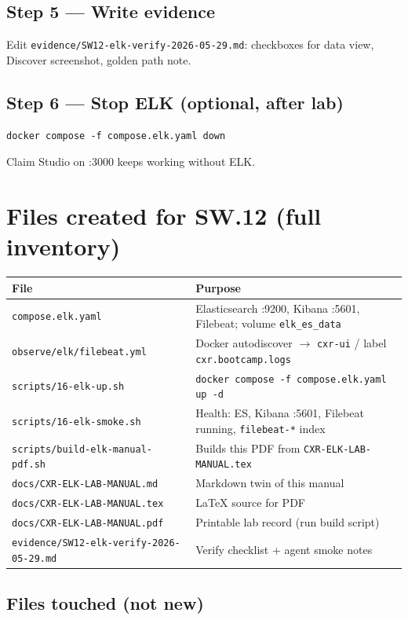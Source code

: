 \documentclass[11pt,a4paper]{report}
\begin{document}
\section{Step 5 --- Write evidence}
Edit \texttt{evidence/SW12-elk-verify-2026-05-29.md}: checkboxes for data view, Discover screenshot, golden path note.

\section{Step 6 --- Stop ELK (optional, after lab)}
\begin{lstlisting}[style=bash]
docker compose -f compose.elk.yaml down
\end{lstlisting}
Claim Studio on :3000 keeps working without ELK.

\chapter{Files created for SW.12 (full inventory)}

\begin{longtable}{@{}p{4.8cm}p{8.2cm}@{}}
\toprule
File & Purpose \\
\midrule
\endhead
\texttt{compose.elk.yaml} & Elasticsearch :9200, Kibana :5601, Filebeat; volume \texttt{elk\_es\_data} \\
\texttt{observe/elk/filebeat.yml} & Docker autodiscover $\rightarrow$ \texttt{cxr-ui} / label \texttt{cxr.bootcamp.logs} \\
\texttt{scripts/16-elk-up.sh} & \texttt{docker compose -f compose.elk.yaml up -d} \\
\texttt{scripts/16-elk-smoke.sh} & Health: ES, Kibana :5601, Filebeat running, \texttt{filebeat-*} index \\
\texttt{scripts/build-elk-manual-pdf.sh} & Builds this PDF from \texttt{CXR-ELK-LAB-MANUAL.tex} \\
\texttt{docs/CXR-ELK-LAB-MANUAL.md} & Markdown twin of this manual \\
\texttt{docs/CXR-ELK-LAB-MANUAL.tex} & LaTeX source for PDF \\
\texttt{docs/CXR-ELK-LAB-MANUAL.pdf} & Printable lab record (run build script) \\
\texttt{evidence/SW12-elk-verify-2026-05-29.md} & Verify checklist + agent smoke notes \\
\end{longtable}

\section{Files touched (not new)}
\end{document}
